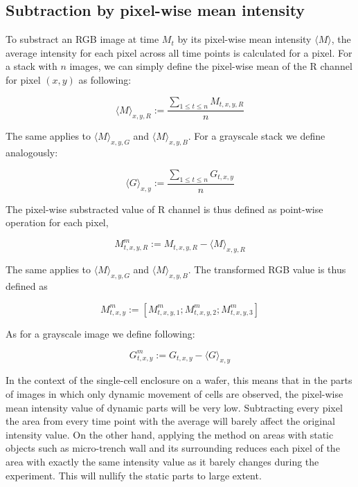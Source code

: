 \documentclass[pdftex,12pt,a4paper]{report}
\begin{document}
\subsection{Subtraction by pixel-wise mean intensity}
\label{subsection:substraction_by_mean}

To substract an RGB image at time $M_t$ by its pixel-wise mean intensity $\langle M \rangle$, the average intensity for each pixel across all time points is calculated  for a pixel. For a stack with $n$ images, we can simply define the pixel-wise mean of the R channel for pixel $(x, y)$ as following:

\begin{equation}
\langle M \rangle_{x, y, R} := \frac{\sum_{1 \leq t \leq n} M_{t, x, y, R}}{n}
\label{eq:mean_calc_rgb}
\end{equation}

The same applies to $\langle M \rangle_{x, y, G}$ and $\langle M \rangle_{x, y, B}$. For a grayscale stack we define analogously:

\begin{equation}
\langle G \rangle_{x, y} := \frac{\sum_{1 \leq t \leq n} G_{t, x, y }}{n}
\label{eq:mean_calc_gs}
\end{equation}

The pixel-wise substracted value of R channel is thus defined as point-wise operation for each pixel,

\begin{equation}
M^m_{t, x, y, R} := M_{t, x, y, R} - \langle M \rangle_{x, y, R}
\label{eq:mean_corr_rgb}
\end{equation}

The same applies to $\langle M \rangle_{x, y, G}$ and $\langle M \rangle_{x, y, B}$. The transformed RGB value is thus defined as

\begin{equation}
M^m_{t, x, y} := [M^m_{t, x, y, 1}; M^m_{t, x, y, 2}; M^m_{t, x, y, 3}]
\end{equation}

As for a grayscale image we define following:

\begin{equation}
G^m_{t, x, y} := G_{t, x, y} - \langle G \rangle_{x, y}
\label{eq:mean_corr_gs}
\end{equation}

In the context of the single-cell enclosure on a wafer, this means that in the parts of images in which only dynamic movement of cells are observed, the pixel-wise mean intensity value of dynamic parts will be very low. Subtracting every pixel the area from every time point with the average will barely affect the original intensity value. On the other hand, applying the method on areas with static objects such as micro-trench wall and its surrounding reduces each pixel of the area with exactly the same intensity value as it barely changes during the experiment. This will nullify the static parts to large extent.
\end{document}
